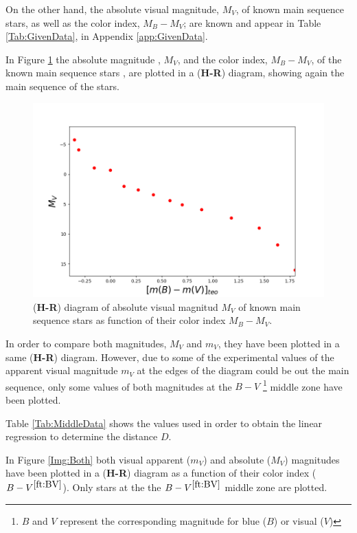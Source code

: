 \documentclass[twoside]{article}
\begin{document}
\begin{multicols}{2}
			On the other hand, the absolute visual magnitude, $M_V$, of known main sequence stars, as well as the color index, $M_B - M_V$; are known \cite{Pleiades} and appear in Table \ref{Tab:GivenData}, in Appendix \ref{app:GivenData}.

			In Figure \ref{Img:Absolute} the absolute magnitude , $M_V$, and the color index, $M_B - M_V$, of the known main sequence stars \cite{Pleiades}, are plotted in a (\textbf{H-R}) diagram, showing again the main sequence of the stars.

				\begin{figure}[H]
					\centering
					\includegraphics[scale=0.35]{Figures/theoabsolute.png}
					\caption{\label{Img:Absolute}(\textbf{H-R}) diagram of absolute visual magnitud $M_V$ of known main sequence stars as function of their color index $M_B - M_V$.}
				\end{figure}

			In order to compare both magnitudes, $M_V$ and $m_V$, they have been plotted in a same (\textbf{H-R}) diagram. However, due to some of the experimental values of the apparent visual magnitude $m_V$ at the edges of the diagram could be out the main sequence, only some values of both magnitudes at the $B-V$ \footnote{\label{ft:BV}$B$ and $V$ represent the corresponding magnitude for blue ($B$) or visual ($V$)} middle zone have been plotted.

			Table \ref{Tab:MiddleData} shows the values used in order to obtain the linear regression to determine the distance $D$.

				

			In Figure \ref{Img:Both} both visual apparent ($m_V$) and absolute ($M_V$) magnitudes have been plotted in a (\textbf{H-R}) diagram as a function of their color index ($B-V^{\ref{ft:BV}}$). Only stars at the the $B-V^{\ref{ft:BV}}$ middle zone are plotted.


\end{multicols}
\end{document}
